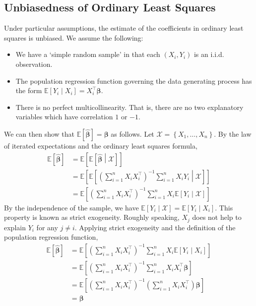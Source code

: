 \documentclass[11pt]{report} %
\begin{document}
\subsection{Unbiasedness of Ordinary Least Squares}

Under particular assumptions, the estimate of the coefficients in ordinary least squares is unbiased. We assume the following:
\begin{itemize}
\item We have a `simple random sample' in that each $\left(X_{i}, Y_{i}\right)$ is an i.i.d. observation.
\item The population regression function governing the data generating process has the form $\mathbb{E}\left[Y_{i}\middle| X_{i}\right] = X_{i}^{\top}\boldsymbol{\beta}$.
\item There is no perfect multicollinearity. That is, there are no two explanatory variables which have correlation $1$ or $-1$.
\end{itemize}
We can then show that $\mathbb{E}\left[\widehat{\boldsymbol{\beta}}\right] = \boldsymbol{\beta}$ as follows. Let $\mathcal{X} = \left\{X_{1}, \dots, X_{n}\right\}$. By the law of iterated expectations and the ordinary least squares formula,
\begin{align}
\mathbb{E}\left[\widehat{\boldsymbol{\beta}}\right] &= \mathbb{E}\left[\mathbb{E}\left[\widehat{\boldsymbol{\beta}}\middle| \mathcal{X}\right]\right] \\
&= \mathbb{E}\left[\mathbb{E}\left[\left(\sum_{i = 1}^{n}X_{i}X_{i}^{\top}\right)^{-1}\sum_{i = 1}^{n}X_{i}Y_{i}\middle| \mathcal{X}\right]\right] \\
&= \mathbb{E}\left[\left(\sum_{i = 1}^{n}X_{i}X_{i}^{\top}\right)^{-1}\sum_{i = 1}^{n}X_{i}\mathbb{E}\left[Y_{i}\middle| \mathcal{X}\right]\right] 
\end{align}
By the independence of the sample, we have $\mathbb{E}\left[Y_{i}\middle| \mathcal{X}\right] = \mathbb{E}\left[Y_{i}\middle| X_{i}\right]$. This property is known as strict exogeneity. Roughly speaking, $X_{j}$ does not help to explain $Y_{i}$ for any $j \neq i$. Applying strict exogeneity and the definition of the population regression function,
\begin{align}
\mathbb{E}\left[\widehat{\boldsymbol{\beta}}\right] &= \mathbb{E}\left[\left(\sum_{i = 1}^{n}X_{i}X_{i}^{\top}\right)^{-1}\sum_{i = 1}^{n}X_{i}\mathbb{E}\left[Y_{i}\middle| X_{i}\right]\right] \\
&=\mathbb{E}\left[\left(\sum_{i = 1}^{n}X_{i}X_{i}^{\top}\right)^{-1}\sum_{i = 1}^{n}X_{i}X_{i}^{\top}\boldsymbol{\beta}\right] \\
&= \mathbb{E}\left[\left(\sum_{i = 1}^{n}X_{i}X_{i}^{\top}\right)^{-1}\left(\sum_{i = 1}^{n}X_{i}X_{i}^{\top}\right)\boldsymbol{\beta}\right] \\
&= \boldsymbol{\beta}
\end{align}
\end{document}

